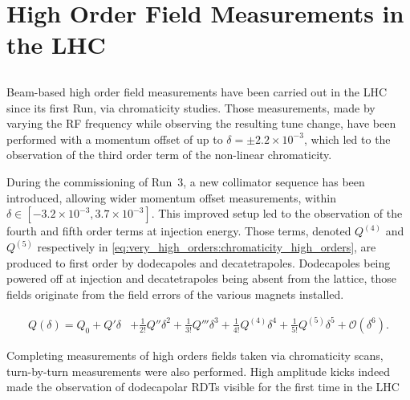 \chapter{High Order Field Measurements in the LHC}
\thumbforchapter{}
\chaptertoc{}
\newpage

\section{}

Beam-based high order field measurements have been carried out in the LHC since its first
Run, via chromaticity studies.
Those measurements, made by varying the RF frequency while observing the resulting tune change, have
been performed with a momentum offset of up to $\delta = \pm 2.2 \times 10^{-3}$, which led to the
observation of the third order term of the non-linear chromaticity.

During the commissioning of Run~3, a new collimator sequence has been introduced, allowing wider
momentum offset measurements, within $\delta \in [-3.2\times 10^{-3},3.7 \times 10^{-3}]$. This
improved setup led to the observation of the fourth and fifth order terms at injection energy.
Those terms, denoted $Q^{(4)}$ and $Q^{(5)}$ respectively in
\cref{eq:very_high_orders:chromaticity_high_orders}, are produced to first order by dodecapoles and
decatetrapoles. Dodecapoles being powered off at injection and decatetrapoles being absent from the
lattice, those fields originate from the field errors of the various magnets installed.

\begin{equation}
\begin{aligned}
Q(\delta) = Q_0 + Q'\delta &+ \frac{1}{2!}Q''\delta^2 + \frac{1}{3!}Q'''\delta^3
                            + \frac{1}{4!}Q^{(4)}\delta^4  + \frac{1}{5!}Q^{(5)}\delta^5
                            + \mathcal{O}(\delta^6).
\end{aligned}
    \label{eq:very_high_orders:chromaticity_high_orders}
\end{equation}

Completing measurements of high orders fields taken via chromaticity scans, turn-by-turn
measurements were also performed. High amplitude kicks indeed made the observation of dodecapolar
RDTs visible for the first time in the LHC





